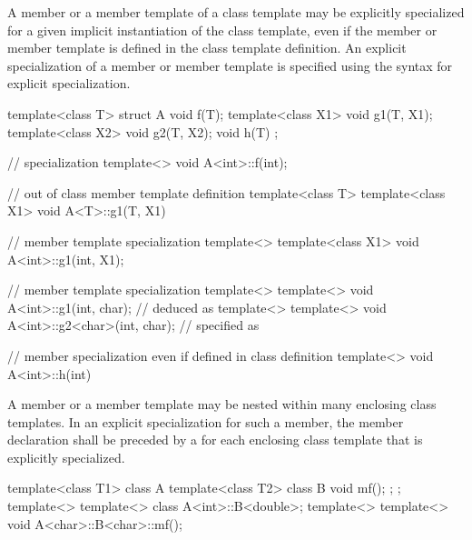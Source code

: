 \pnum
A member or a member template of a class template may be explicitly specialized
for a given implicit instantiation of the class template, even if the member
or member template is defined in the class template definition.
An explicit specialization of a member or member template is specified using the
syntax for explicit specialization.
\begin{example}
\begin{codeblock}
template<class T> struct A {
  void f(T);
  template<class X1> void g1(T, X1);
  template<class X2> void g2(T, X2);
  void h(T) { }
};

// specialization
template<> void A<int>::f(int);

// out of class member template definition
template<class T> template<class X1> void A<T>::g1(T, X1) { }

// member template specialization
template<> template<class X1> void A<int>::g1(int, X1);

// member template specialization
template<> template<>
  void A<int>::g1(int, char);           //  deduced as 
template<> template<>
  void A<int>::g2<char>(int, char);     //  specified as 

// member specialization even if defined in class definition
template<> void A<int>::h(int) { }
\end{codeblock}
\end{example}

\pnum
A member or a member template may be nested within many enclosing class
templates.
In an explicit specialization for such a member,
the member declaration shall be preceded by a
for each enclosing class template that is explicitly specialized.
\begin{example}
\begin{codeblock}
template<class T1> class A {
  template<class T2> class B {
    void mf();
  };
};
template<> template<> class A<int>::B<double>;
template<> template<> void A<char>::B<char>::mf();
\end{codeblock}
\end{example}

